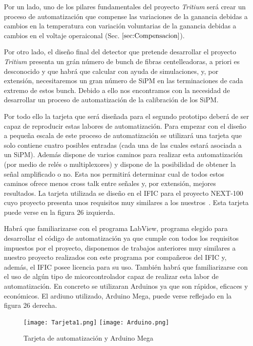 \begin{enumerate}
Por un lado, uno de los pilares fundamentales del proyecto \textit{Tritium} será crear un proceso de automatización que compense las variaciones de la ganancia debidas a cambios en la temperatura con variación voluntarias de la ganancia debidas a cambios en el voltaje operaiconal (Sec. $\ref{sec:Compensacion}$).

Por otro lado, el diseño final del detector que pretende desarrollar el proyecto \textit{Tritium} presenta un grán número de bunch de fibras centelleadoras, a priori es desconocido y que habrá que calcular con ayuda de simulaciones, y, por extensión, necesitaremos un gran número de SiPM en las terminaciones de cada extremo de estos bunch. Debido a ello nos encontramos con la necesidad de desarrollar un proceso de automatización de la calibración de los SiPM.  

Por todo ello la tarjeta que será diseñada para el segundo prototipo deberá de ser capaz de reproducir estas labores de automatización. Para empezar con el diseño a pequeña escala de este proceso de automatización se utilizará una tarjeta que solo contiene cuatro posibles entradas (cada una de las cuales estará asociada a un SiPM). Además dispone de varios caminos para realizar esta automatización (por medio de relés o multiplexores) y dispone de la posibilidad de obtener la señal amplificado o no. Esta nos permitirá determinar cual de todos estos caminos ofrece menos cross talk entre señales y, por extensión, mejores resultados. La tarjeta utilizada se diseño en el IFIC para el proyecto NEXT-100 cuyo proyecto presenta unos requisitos muy similares a los nuestros~\cite{Marc}. Esta tarjeta puede verse en la figura 26 izquierda.

Habrá que familiarizarse con el programa LabView, programa elegido para desarrollar el código de automatización ya que cumple con todos los requisitos impuestos por el proyecto, disponemos de trabajos anteriores muy similares a nuestro proyecto realizados con este programa por compañeros del IFIC y, además, el IFIC posee licencia para su uso. También habrá que familiarizarse con el uso de algún tipo de micorcontrolador capaz de realizar esta labor de automatización. En concreto se utilizaran Arduinos ya que son rápidos, eficaces y económicos. El ardiuno utilizado, Arduino Mega, puede verse reflejado en la figura 26 derecha.

\begin{figure}[htb]
\centering
{
\texttt{[image: Tarjeta1.png]} 
}
{
\texttt{[image: Arduino.png]} 
}
\caption{Tarjeta de automatización y Arduino Mega\label{arduino}}
\end{figure} 


\end{enumerate}
